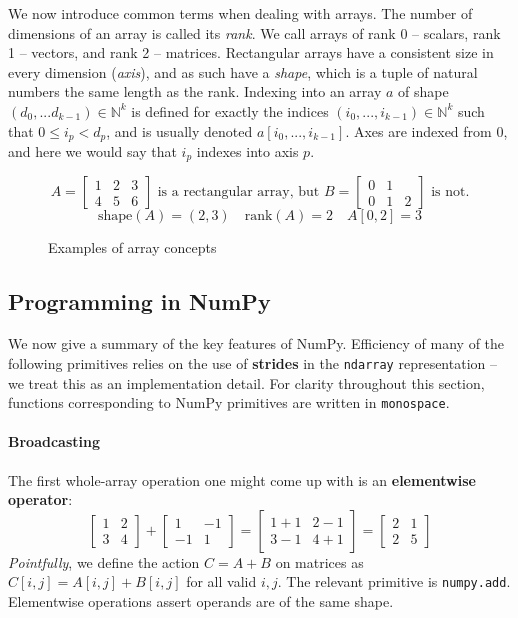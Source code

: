 We now introduce common terms when dealing with arrays. The number of dimensions of an array is called its \textit{rank}. We call arrays of rank 0  -- scalars, rank 1 -- vectors, and rank 2 -- matrices. Rectangular arrays have a consistent size in every dimension (\textit{axis}), and as such have a \textit{shape}, which is a tuple of natural numbers the same length as the rank. Indexing into an array $a$ of shape $(d_0, ... d_{k-1}) \in \mathbb{N}^k$ is defined for exactly the indices $(i_0, ..., i_{k-1}) \in \mathbb{N}^k$ such that $0 \le i_p < d_p$, and is usually denoted $a[i_0, ..., i_{k-1}]$. Axes are indexed from 0, and here we would say that $i_p$ indexes into axis $p$.
\begin{figure}[h]
    \centering
    $$ A = \begin{bmatrix}
        1 & 2 & 3 \\ 
        4 & 5 & 6
    \end{bmatrix} \text{ is a rectangular array, but } B = \begin{bmatrix}
    0 & 1 & \\
    0 & 1 & 2
    \end{bmatrix} \text{ is not.} $$
    $$ \mathrm{shape}(A) = (2, 3)  \quad \mathrm{rank}(A) = 2 \quad A[0, 2] = 3 $$
    \caption{Examples of array concepts}
    \label{fig:array-examples}
\end{figure}

\subsection{Programming in NumPy} 

We now give a summary of the key features of NumPy. Efficiency of many of the following primitives relies on the use of \textbf{strides} in the \texttt{ndarray} representation \cite{harris2020array} -- we treat this as an implementation detail. For clarity throughout this section, functions corresponding to NumPy primitives are written in \texttt{monospace}.

\paragraph{Broadcasting}

The first whole-array operation one might come up with is an \textbf{elementwise operator}:
$$ \begin{bmatrix} 1 & 2 \\ 3 & 4 \end{bmatrix} 
+ \begin{bmatrix}1 & -1 \\ -1 & 1 \end{bmatrix}
= \begin{bmatrix}1 + 1 & 2 - 1 \\ 3 - 1 & 4 + 1 \end{bmatrix}
= \begin{bmatrix}2 & 1 \\ 2 & 5 \end{bmatrix} $$
\textit{Pointfully}, we define the action $C = A + B$ on matrices as $C[i, j] = A[i, j] + B[i, j]$ for all valid $i, j$. The relevant primitive is \texttt{numpy.add}. Elementwise operations assert operands are of the same shape.

